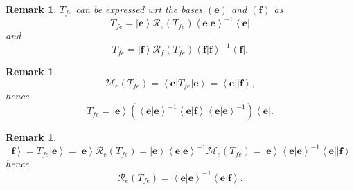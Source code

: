 \documentclass[aps,preprint]{revtex4}%
\newtheorem{remark}[theorem]{Remark}
\begin{document}
\begin{remark}
$T_{fe}$ can be expressed wrt the bases $\left(  \mathbf{e}\right)  $ and
$\left(  \mathbf{f}\right)  $ as
\begin{equation}
T_{fe}=\left\vert \mathbf{e}\right\rangle \mathcal{R}_{e}\left(
T_{fe}\right)  \left\langle \left.  \mathbf{e}\right\vert \mathbf{e}%
\right\rangle ^{-1}\left\langle \mathbf{e}\right\vert
\end{equation}
and%
\begin{equation}
T_{fe}=\left\vert \mathbf{f}\right\rangle \mathcal{R}_{f}\left(
T_{fe}\right)  \left\langle \left.  \mathbf{f}\right\vert \mathbf{f}%
\right\rangle ^{-1}\left\langle \mathbf{f}\right\vert .
\end{equation}

\end{remark}

\begin{remark}%
\begin{equation}
\mathcal{M}_{e}\left(  T_{fe}\right)  =\left\langle \mathbf{e}\right\vert
T_{fe}\left\vert \mathbf{e}\right\rangle =\left\langle \mathbf{e}\right\vert
\left\vert \mathbf{f}\right\rangle ,
\end{equation}
hence
\begin{equation}
T_{fe}=\left\vert \mathbf{e}\right\rangle \left(  \overset{}{\left\langle
\left.  \mathbf{e}\right\vert \mathbf{e}\right\rangle ^{-1}\left\langle
\left.  \mathbf{e}\right\vert \mathbf{f}\right\rangle \left\langle \left.
\mathbf{e}\right\vert \mathbf{e}\right\rangle ^{-1}}\right)  \left\langle
\mathbf{e}\right\vert .
\end{equation}

\end{remark}

\begin{remark}%
\begin{equation}
\left\vert \mathbf{f}\right\rangle =T_{fe}\left\vert \mathbf{e}\right\rangle
=\left\vert \mathbf{e}\right\rangle \mathcal{R}_{e}\left(  T_{fe}\right)
=\left\vert \mathbf{e}\right\rangle \left\langle \left.  \mathbf{e}\right\vert
\mathbf{e}\right\rangle ^{-1}\mathcal{M}_{e}\left(  T_{fe}\right)  =\left\vert
\mathbf{e}\right\rangle \left\langle \left.  \mathbf{e}\right\vert
\mathbf{e}\right\rangle ^{-1}\left\langle \mathbf{e}\right\vert \left\vert
\mathbf{f}\right\rangle
\end{equation}
hence
\begin{equation}
\mathcal{R}_{e}\left(  T_{fe}\right)  =\left\langle \left.  \mathbf{e}%
\right\vert \mathbf{e}\right\rangle ^{-1}\left\langle \left.  \mathbf{e}%
\right\vert \mathbf{f}\right\rangle .
\end{equation}

\end{remark}
\end{document}
